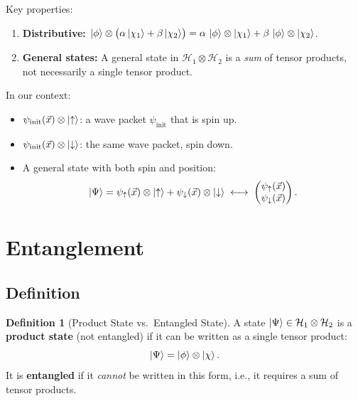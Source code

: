 \documentclass[11pt,a4paper]{article}
\theoremstyle{definition}
\newtheorem{definition}{Definition}[section]
\theoremstyle{plain}
\theoremstyle{remark}
\begin{document}
Key properties:
\begin{enumerate}
    \item \textbf{Distributive:} $\ket{\phi}\otimes\bigl(\alpha\ket{\chi_1} + \beta\ket{\chi_2}\bigr) = \alpha\,\ket{\phi}\otimes\ket{\chi_1} + \beta\,\ket{\phi}\otimes\ket{\chi_2}$.
    \item \textbf{General states:} A general state in $\mathcal{H}_1 \otimes \mathcal{H}_2$ is a \emph{sum} of tensor products, not necessarily a single tensor product.
\end{enumerate}

In our context:
\begin{itemize}
    \item $\psi_{\text{init}}(\vec{x}) \otimes \ket{\uparrow}$: a wave packet $\psi_{\text{init}}$ that is spin up.
    \item $\psi_{\text{init}}(\vec{x}) \otimes \ket{\downarrow}$: the same wave packet, spin down.
    \item A general state with both spin and position:
    \[
        \ket{\Psi} = \psi_\uparrow(\vec{x})\otimes\ket{\uparrow} + \psi_\downarrow(\vec{x})\otimes\ket{\downarrow} \;\longleftrightarrow\; \begin{pmatrix}\psi_\uparrow(\vec{x}) \\ \psi_\downarrow(\vec{x})\end{pmatrix}.
    \]
\end{itemize}

\section{Entanglement}

\subsection{Definition}

\begin{definition}[Product State vs.\ Entangled State]
    A state $\ket{\Psi} \in \mathcal{H}_1 \otimes \mathcal{H}_2$ is a \textbf{product state} (not entangled) if it can be written as a single tensor product:
    \[
        \ket{\Psi} = \ket{\phi}\otimes\ket{\chi}.
    \]
    It is \textbf{entangled} if it \emph{cannot} be written in this form, i.e., it requires a sum of tensor products.
\end{definition}
\end{document}
